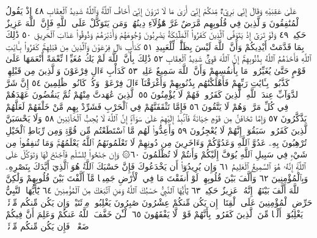 عَلَىٰ عَقِبَيْهِ وَقَالَ إِنِّي بَرِيٓءࣱ مِّنكُمْ إِنِّيٓ أَرَىٰ مَا لَا
تَرَوْنَ إِنِّيٓ أَخَافُ ٱللَّهَۚ وَٱللَّهُ شَدِيدُ ٱلْعِقَابِ ٤٨ إِذْ يَقُولُ
ٱلْمُنَٰفِقُونَ وَٱلَّذِينَ فِي قُلُوبِهِم مَّرَضٌ غَرَّ هَٰٓؤُلَآءِ دِينُهُمْۗ
وَمَن يَتَوَكَّلْ عَلَى ٱللَّهِ فَإِنَّ ٱللَّهَ عَزِيزٌ حَكِيمࣱ ٤٩ وَلَوْ
تَرَىٰٓ إِذْ يَتَوَفَّى ٱلَّذِينَ كَفَرُوا۟ ٱلْمَلَٰٓئِكَةُ يَضْرِبُونَ
وُجُوهَهُمْ وَأَدْبَٰرَهُمْ وَذُوقُوا۟ عَذَابَ ٱلْحَرِيقِ ٥٠ ذَٰلِكَ
بِمَا قَدَّمَتْ أَيْدِيكُمْ وَأَنَّ ٱللَّهَ لَيْسَ بِظَلَّٰمࣲ لِّلْعَبِيدِ ٥١
كَدَأْبِ ءَالِ فِرْعَوْنَ وَٱلَّذِينَ مِن قَبْلِهِمْۚ كَفَرُوا۟ بِـَٔايَٰتِ ٱللَّهِ
فَأَخَذَهُمُ ٱللَّهُ بِذُنُوبِهِمْۚ إِنَّ ٱللَّهَ قَوِيࣱّ شَدِيدُ ٱلْعِقَابِ ٥٢
ذَٰلِكَ بِأَنَّ ٱللَّهَ لَمْ يَكُ مُغَيِّرࣰا نِّعْمَةً أَنْعَمَهَا عَلَىٰ قَوْمٍ حَتَّىٰ
يُغَيِّرُوا۟ مَا بِأَنفُسِهِمْ وَأَنَّ ٱللَّهَ سَمِيعٌ عَلِيمࣱ ٥٣ كَدَأْبِ ءَالِ
فِرْعَوْنَ وَٱلَّذِينَ مِن قَبْلِهِمْۚ كَذَّبُوا۟ بِـَٔايَٰتِ رَبِّهِمْ فَأَهْلَكْنَٰهُم
بِذُنُوبِهِمْ وَأَغْرَقْنَآ ءَالَ فِرْعَوْنَۚ وَكُلࣱّ كَانُوا۟ ظَٰلِمِينَ ٥٤
إِنَّ شَرَّ ٱلدَّوَآبِّ عِندَ ٱللَّهِ ٱلَّذِينَ كَفَرُوا۟ فَهُمْ لَا يُؤْمِنُونَ ٥٥
ٱلَّذِينَ عَٰهَدتَّ مِنْهُمْ ثُمَّ يَنقُضُونَ عَهْدَهُمْ فِي كُلِّ
مَرَّةࣲ وَهُمْ لَا يَتَّقُونَ ٥٦ فَإِمَّا تَثْقَفَنَّهُمْ فِي ٱلْحَرْبِ فَشَرِّدْ بِهِم
مَّنْ خَلْفَهُمْ لَعَلَّهُمْ يَذَّكَّرُونَ ٥٧ وَإِمَّا تَخَافَنَّ مِن قَوْمٍ
خِيَانَةࣰ فَٱنۢبِذْ إِلَيْهِمْ عَلَىٰ سَوَآءٍۚ إِنَّ ٱللَّهَ لَا يُحِبُّ ٱلْخَآئِنِينَ ٥٨
وَلَا يَحْسَبَنَّ ٱلَّذِينَ كَفَرُوا۟ سَبَقُوٓا۟ۚ إِنَّهُمْ لَا يُعْجِزُونَ ٥٩
وَأَعِدُّوا۟ لَهُم مَّا ٱسْتَطَعْتُم مِّن قُوَّةࣲ وَمِن رِّبَاطِ ٱلْخَيْلِ
تُرْهِبُونَ بِهِۦ عَدُوَّ ٱللَّهِ وَعَدُوَّكُمْ وَءَاخَرِينَ مِن دُونِهِمْ
لَا تَعْلَمُونَهُمُ ٱللَّهُ يَعْلَمُهُمْۚ وَمَا تُنفِقُوا۟ مِن شَيْءࣲ فِي سَبِيلِ
ٱللَّهِ يُوَفَّ إِلَيْكُمْ وَأَنتُمْ لَا تُظْلَمُونَ ٦٠۞ وَإِن جَنَحُوا۟ لِلسَّلْمِ
فَٱجْنَحْ لَهَا وَتَوَكَّلْ عَلَى ٱللَّهِۚ إِنَّهُۥ هُوَ ٱلسَّمِيعُ ٱلْعَلِيمُ ٦١
وَإِن يُرِيدُوٓا۟ أَن يَخْدَعُوكَ فَإِنَّ حَسْبَكَ ٱللَّهُۚ هُوَ ٱلَّذِيٓ أَيَّدَكَ
بِنَصْرِهِۦ وَبِٱلْمُؤْمِنِينَ ٦٢ وَأَلَّفَ بَيْنَ قُلُوبِهِمْۚ لَوْ أَنفَقْتَ
مَا فِي ٱلْأَرْضِ جَمِيعࣰا مَّآ أَلَّفْتَ بَيْنَ قُلُوبِهِمْ وَلَٰكِنَّ ٱللَّهَ
أَلَّفَ بَيْنَهُمْۚ إِنَّهُۥ عَزِيزٌ حَكِيمࣱ ٦٣ يَٰٓأَيُّهَا ٱلنَّبِيُّ حَسْبُكَ
ٱللَّهُ وَمَنِ ٱتَّبَعَكَ مِنَ ٱلْمُؤْمِنِينَ ٦٤ يَٰٓأَيُّهَا ٱلنَّبِيُّ حَرِّضِ
ٱلْمُؤْمِنِينَ عَلَى ٱلْقِتَالِۚ إِن يَكُن مِّنكُمْ عِشْرُونَ صَٰبِرُونَ
يَغْلِبُوا۟ مِا۟ئَتَيْنِۚ وَإِن يَكُن مِّنكُم مِّا۟ئَةࣱ يَغْلِبُوٓا۟ أَلْفࣰا مِّنَ
ٱلَّذِينَ كَفَرُوا۟ بِأَنَّهُمْ قَوْمࣱ لَّا يَفْقَهُونَ ٦٥ ٱلْـَٰٔنَ خَفَّفَ
ٱللَّهُ عَنكُمْ وَعَلِمَ أَنَّ فِيكُمْ ضَعْفࣰاۚ فَإِن يَكُن مِّنكُم مِّا۟ئَةࣱ
